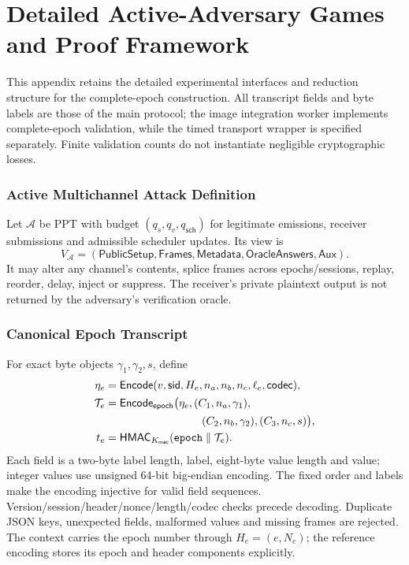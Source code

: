 \documentclass[journal]{IEEEtran}
\theoremstyle{definition}
\theoremstyle{game}
\begin{document}
\section{Detailed Active-Adversary Games and Proof Framework}
\label{subsec:active-security-proofs}
This appendix retains the detailed experimental interfaces and reduction
structure for the complete-epoch construction. All transcript fields
and byte labels are those of the main protocol; the image integration worker
implements complete-epoch validation, while the timed transport wrapper is
specified separately. Finite validation counts do not instantiate negligible
cryptographic losses.

\subsubsection{Active Multichannel Attack Definition}
Let $\mathcal A$ be PPT with budget $(q_s,q_v,q_{\mathsf{sch}})$ for legitimate
emissions, receiver submissions and admissible scheduler updates. Its view is
\[
V_{\mathcal A}=(\mathsf{PublicSetup},\mathsf{Frames},\mathsf{Metadata},
\mathsf{OracleAnswers},\mathsf{Aux}).
\]
It may alter any channel's contents, splice frames across epochs/sessions,
replay, reorder, delay, inject or suppress. The receiver's private plaintext
output is not returned by the adversary's verification oracle.

\subsubsection{Canonical Epoch Transcript}
For exact byte objects $\gamma_1,\gamma_2,s$, define
\begin{align}
\eta_e&=\mathsf{Encode}(v,\mathsf{sid},H_e,n_a,n_b,n_c,\ell_e,\mathsf{codec}),\\
\mathcal T_e&=\mathsf{Encode}_{\mathsf{epoch}}\bigl(\eta_e,(C_1,n_a,\gamma_1),\nonumber\\
&\hspace{31mm}(C_2,n_b,\gamma_2),(C_3,n_c,s)\bigr),\\
t_e&=\mathsf{HMAC}_{K_{\mathsf{mac}}}(\texttt{epoch}\parallel\mathcal T_e).
\end{align}
Each field is a two-byte label length, label, eight-byte value length and
value; integer values use unsigned 64-bit big-endian encoding. The fixed
order and labels make the encoding injective for valid field sequences.
Version/session/header/nonce/length/codec checks precede decoding. Duplicate
JSON keys, unexpected fields, malformed values and missing frames are rejected.
The context carries the epoch number through $H_e=(e,N_e)$; the reference
encoding stores its epoch and header components explicitly.
\end{document}
